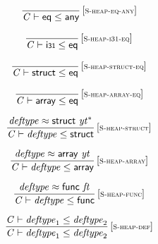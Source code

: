 $$
\begin{array}{@{}c@{}}\displaystyle
\frac{
}{
{\mathit{C}} \vdash \mathsf{eq} \leq \mathsf{any}
} \, {[\textsc{\scriptsize S{-}heap{-}eq{-}any}]}
\qquad
\end{array}
$$

$$
\begin{array}{@{}c@{}}\displaystyle
\frac{
}{
{\mathit{C}} \vdash \mathsf{i{\scriptstyle31}} \leq \mathsf{eq}
} \, {[\textsc{\scriptsize S{-}heap{-}i31{-}eq}]}
\qquad
\end{array}
$$

$$
\begin{array}{@{}c@{}}\displaystyle
\frac{
}{
{\mathit{C}} \vdash \mathsf{struct} \leq \mathsf{eq}
} \, {[\textsc{\scriptsize S{-}heap{-}struct{-}eq}]}
\qquad
\end{array}
$$

$$
\begin{array}{@{}c@{}}\displaystyle
\frac{
}{
{\mathit{C}} \vdash \mathsf{array} \leq \mathsf{eq}
} \, {[\textsc{\scriptsize S{-}heap{-}array{-}eq}]}
\qquad
\end{array}
$$

$$
\begin{array}{@{}c@{}}\displaystyle
\frac{
{\mathit{deftype}} \approx \mathsf{struct}~{{\mathit{yt}}^\ast}
}{
{\mathit{C}} \vdash {\mathit{deftype}} \leq \mathsf{struct}
} \, {[\textsc{\scriptsize S{-}heap{-}struct}]}
\qquad
\end{array}
$$

$$
\begin{array}{@{}c@{}}\displaystyle
\frac{
{\mathit{deftype}} \approx \mathsf{array}~{\mathit{yt}}
}{
{\mathit{C}} \vdash {\mathit{deftype}} \leq \mathsf{array}
} \, {[\textsc{\scriptsize S{-}heap{-}array}]}
\qquad
\end{array}
$$

$$
\begin{array}{@{}c@{}}\displaystyle
\frac{
{\mathit{deftype}} \approx \mathsf{func}~{\mathit{ft}}
}{
{\mathit{C}} \vdash {\mathit{deftype}} \leq \mathsf{func}
} \, {[\textsc{\scriptsize S{-}heap{-}func}]}
\qquad
\end{array}
$$

$$
\begin{array}{@{}c@{}}\displaystyle
\frac{
{\mathit{C}} \vdash {\mathit{deftype}}_{{1}} \leq {\mathit{deftype}}_{{2}}
}{
{\mathit{C}} \vdash {\mathit{deftype}}_{{1}} \leq {\mathit{deftype}}_{{2}}
} \, {[\textsc{\scriptsize S{-}heap{-}def}]}
\qquad
\end{array}
$$

